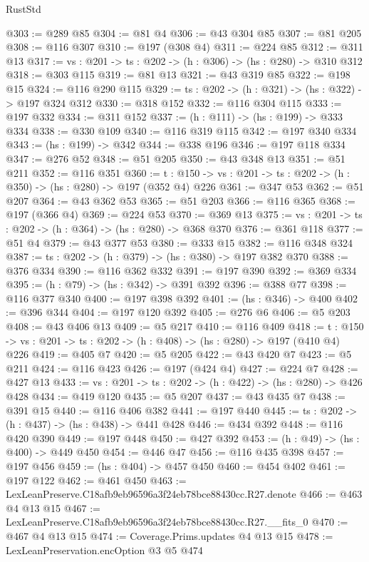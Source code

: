 \begin{lexlean}{RustStd}
\begin{coremodule}
@303 := @289 @85
@304 := @81 @4
@306 := @43 @304 @85
@307 := @81 @205
@308 := @116 @307
@310 := @197 (@308 @4)
@311 := @224 @85
@312 := @311 @13
@317 := {vs : @201} -> {ts : @202} -> (h : @306) -> (hs : @280) -> @310 @312
@318 := @303 @115
@319 := @81 @13
@321 := @43 @319 @85
@322 := @198 @15
@324 := @116 @290 @115
@329 := {ts : @202} -> (h : @321) -> (hs : @322) -> @197 @324 @312
@330 := @318 @152
@332 := @116 @304 @115
@333 := @197 @332
@334 := @311 @152
@337 := (h : @111) -> (hs : @199) -> @333 @334
@338 := @330 @109
@340 := @116 @319 @115
@342 := @197 @340 @334
@343 := (hs : @199) -> @342
@344 := @338 @196
@346 := @197 @118 @334
@347 := @276 @52
@348 := @51 @205
@350 := @43 @348 @13
@351 := @51 @211
@352 := @116 @351
@360 := {t : @150} -> {vs : @201} -> {ts : @202} -> (h : @350) -> (hs : @280) -> @197 (@352 @4) @226
@361 := @347 @53
@362 := @51 @207
@364 := @43 @362 @53
@365 := @51 @203
@366 := @116 @365
@368 := @197 (@366 @4)
@369 := @224 @53
@370 := @369 @13
@375 := {vs : @201} -> {ts : @202} -> (h : @364) -> (hs : @280) -> @368 @370
@376 := @361 @118
@377 := @51 @4
@379 := @43 @377 @53
@380 := @333 @15
@382 := @116 @348 @324
@387 := {ts : @202} -> (h : @379) -> (hs : @380) -> @197 @382 @370
@388 := @376 @334
@390 := @116 @362 @332
@391 := @197 @390
@392 := @369 @334
@395 := (h : @79) -> (hs : @342) -> @391 @392
@396 := @388 @77
@398 := @116 @377 @340
@400 := @197 @398 @392
@401 := (hs : @346) -> @400
@402 := @396 @344
@404 := @197 @120 @392
@405 := @276 @6
@406 := @5 @203
@408 := @43 @406 @13
@409 := @5 @217
@410 := @116 @409
@418 := {t : @150} -> {vs : @201} -> {ts : @202} -> (h : @408) -> (hs : @280) -> @197 (@410 @4) @226
@419 := @405 @7
@420 := @5 @205
@422 := @43 @420 @7
@423 := @5 @211
@424 := @116 @423
@426 := @197 (@424 @4)
@427 := @224 @7
@428 := @427 @13
@433 := {vs : @201} -> {ts : @202} -> (h : @422) -> (hs : @280) -> @426 @428
@434 := @419 @120
@435 := @5 @207
@437 := @43 @435 @7
@438 := @391 @15
@440 := @116 @406 @382
@441 := @197 @440
@445 := {ts : @202} -> (h : @437) -> (hs : @438) -> @441 @428
@446 := @434 @392
@448 := @116 @420 @390
@449 := @197 @448
@450 := @427 @392
@453 := (h : @49) -> (hs : @400) -> @449 @450
@454 := @446 @47
@456 := @116 @435 @398
@457 := @197 @456
@459 := (hs : @404) -> @457 @450
@460 := @454 @402
@461 := @197 @122
@462 := @461 @450
@463 := LexLeanPreserve.C18afb9eb96596a3f24eb78bce88430cc.R27.denote
@466 := @463 @4 @13 @15
@467 := LexLeanPreserve.C18afb9eb96596a3f24eb78bce88430cc.R27.__fits_0
@470 := @467 @4 @13 @15
@474 := Coverage.Prims.updates @4 @13 @15
@478 := LexLeanPreservation.encOption @3 @5 @474

\end{coremodule}
\end{lexlean}
